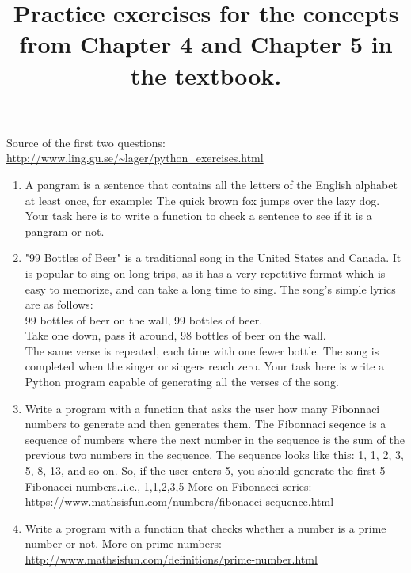 \documentclass[10pt,a4paper]{article}
\title{Practice exercises for the concepts from Chapter 4 and Chapter 5 in the textbook.}
\begin{document}
\maketitle

Source of the first two questions: \url{http://www.ling.gu.se/~lager/python_exercises.html}

\begin{enumerate}
\item A pangram is a sentence that contains all the letters of the English alphabet at least once, for example: The quick brown fox jumps over the lazy dog. Your task here is to write a function to check a sentence to see if it is a pangram or not.

\item "99 Bottles of Beer" is a traditional song in the United States and Canada. It is popular to sing on long trips, as it has a very repetitive format which is easy to memorize, and can take a long time to sing. The song's simple lyrics are as follows:
\\ 99 bottles of beer on the wall, 99 bottles of beer.
\\ Take one down, pass it around, 98 bottles of beer on the wall. \\
The same verse is repeated, each time with one fewer bottle. The song is completed when the singer or singers reach zero. Your task here is write a Python program capable of generating all the verses of the song.

\item Write a program with a function that asks the user how many Fibonnaci numbers to generate and then generates them. The Fibonnaci seqence is a sequence of numbers where the next number in the sequence is the sum of the previous two numbers in the sequence. The sequence looks like this: 1, 1, 2, 3, 5, 8, 13, and so on.  So, if the user enters 5, you should generate the first 5 Fibonacci numbers..i.e., 1,1,2,3,5
More on Fibonacci series: \url{https://www.mathsisfun.com/numbers/fibonacci-sequence.html}

\item Write a program with a function that checks whether a number is a prime number or not. More on prime numbers: \url{http://www.mathsisfun.com/definitions/prime-number.html}

\end{enumerate}
\end{document}
